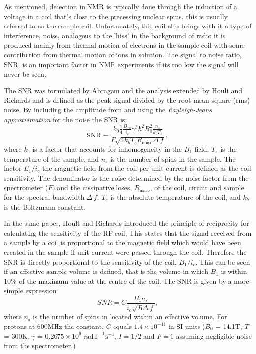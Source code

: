 As mentioned, detection in NMR is typically done through the induction of a voltage in a coil that's close
to the precessing nuclear spins, this is usually referred to as the sample coil. Unfortunately,
this coil also brings with it a type of interference, noise, analogous to the 'hiss' in the background
of radio it is produced mainly from thermal motion of electrons in the sample coil with some contribution from thermal
motion of ions in solution. The signal to noise ratio, SNR, is an important factor in NMR experiments if its too low
the signal will never be seen.

The SNR was formulated by Abragam\citep{Abragam:1961vg} and the analysis extended by Hoult and
Richards\citep{Hoult:1976dw} and is defined as the peak signal divided by the root mean square (rms) noise. By including
the amplitude from  and using the \textit{Rayleigh-Jeans approxiamation} for the noise the SNR is:
\begin{equation}\label{eqn:SNR}
  \text{SNR} = \frac{k_0\frac{1}{4}\frac{B_{1x}}{i_c}\gamma^3\hbar^2B_0^2\frac{n_s}{k_bT_s}}{F\sqrt{4k_bT_cR_{\text{noise}}\Delta~f}},
\end{equation}
where $k_0$ is a factor that accounts for inhomogeneity in the $B_1$ field, $T_s$ is the
temperature of the sample, and $n_s$ is the number of spins in the sample. The factor $B_1/i_c$ the magnetic field from the coil per unit current is defined
as the coil sensitivity. The denominator is the noise determined by the noise factor from the spectrometer ($F$) and
the dissipative loses, $R_{\text{noise}}$, of the coil, circuit and sample for the spectral bandwidth $\Delta~f$.
$T_c$ is the absolute temperature of the coil, and $k_b$ is the Boltzmann constant.

In the same paper, Hoult and Richards introduced the principle of reciprocity for calculating the
sensitivity of the RF coil, This states that the signal received from a sample by a coil is proportional to the magnetic
field which would have been created in the sample if unit current were passed through the coil. Therefore the SNR is
directly proportional to the sensitivity of the coil, $B_1/i_c$. This can be seen if an
effective sample volume is defined, that is the volume in which $B_1$ is within 10\% of the maximum
value at the centre of the coil. The SNR is given by a more simple expression\citep{vanBentum:2007fda}:
\begin{equation}
  SNR = C\frac{B_1n_s}{i_c\sqrt{R\Delta~f}},
\end{equation}
where $n_s$ is the number of spins in located within an effective volume.
For protons at 600MHz the constant, $C$ equals $1.4\times10^{-11}$ in SI units ($B_0$ = 14.1T, $T$ = 300K, $\gamma$ =
$0.2675\times10^9$ $\text{rad} \text{T}^{-1}\text{s}^{-1}$, $I = 1/2$ and $F = 1$ assuming negligible noise from the spectrometer.)

